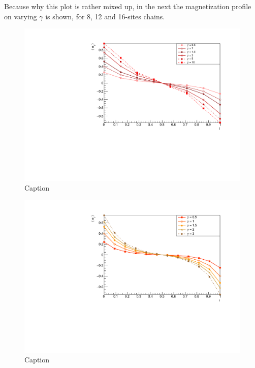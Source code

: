 Because why this plot is rather mixed up, in the next the magnetization profile on varying $\gamma$ is shown, for 8, 12 and 16-sites chains.

\begin{figure}[H]
    \centering
    \includegraphics[scale=0.7]{Figures/8sites_comparison/8sites_LMvsGamma.pdf}
    \caption{Caption}
    \label{fig:my_label}
\end{figure}

\begin{figure}[H]
    \centering
    \includegraphics[scale=0.7]{Figures/12sites/12sites_LMvsGamma.pdf}
    \caption{Caption}
    \label{fig:my_label}
\end{figure}


